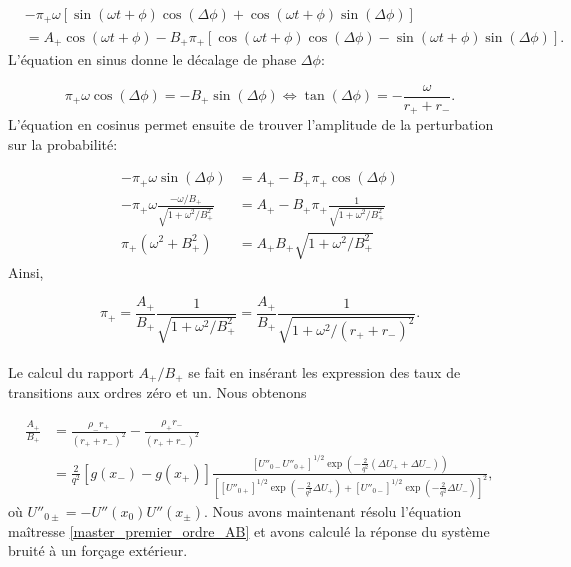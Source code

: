 \begin{equation}
\begin{split}
	&-\pi_+ \omega [\sin(\omega t+\phi)\cos(\Delta\phi) + \cos(\omega t+\phi)\sin(\Delta\phi)] \\
	&= A_+ \cos(\omega t+\phi) - B_+ \pi_+ [\cos(\omega t+\phi)\cos(\Delta\phi) - \sin(\omega t+\phi)\sin(\Delta\phi)].
\end{split}
\end{equation}
L'équation en sinus donne le décalage de phase $\Delta\phi$:

\begin{equation}\label{eq_sinus}
	\pi_+ \omega \cos(\Delta\phi) = -B_+ \sin(\Delta\phi) \iff \tan(\Delta\phi) = -\frac{\omega}{r_+ + r_-}.
\end{equation}
L'équation en cosinus permet ensuite de trouver l'amplitude de la perturbation sur la probabilité:

\begin{equation}\label{eq_cosinus}
\begin{split}
	-\pi_+\omega \sin(\Delta\phi) &= A_+ - B_+ \pi_+ \cos(\Delta\phi) \\
	-\pi_+ \omega \frac{-\omega/B_+}{\sqrt{1+\omega^2/B_+^2}} &= A_+ - B_+ \pi_+ \frac{1}{\sqrt{1+\omega^2/B_+^2}} \\
	\pi_+ (\omega^2 + B_+^2) &= A_+B_+ \sqrt{1+\omega^2/B_+^2}
\end{split}
\end{equation}
Ainsi,

\begin{equation}\label{expr_pi_AB}
	\pi_+ = \frac{A_+}{B_+}  \frac{1}{\sqrt{1+\omega^2/B_+^2}} = \frac{A_+}{B_+} \frac{1}{\sqrt{1+\omega^2/(r_+ + r_-)^2}}
	.
\end{equation}

\paragraph{} Le calcul du rapport $A_+/B_+$ se fait en insérant les expression des taux de transitions aux ordres zéro et un. Nous obtenons

\begin{equation}\label{rapport_AB}
\begin{split}
	\frac{A_+}{B_+} &= \frac{\rho_- r_+}{(r_+ + r_-)^2} - \frac{\rho_+ r_-}{(r_+ + r_-)^2} \\
	&= \frac{2}{q^2} [g(x_-)-g(x_+)] 
	\frac{
		[U''_{0-}U''_{0+}]^{1/2} \exp(-\frac{2}{q^2} (\Delta U_+ + \Delta U_-))
	}
	{
		\left[
			[U''_{0+}]^{1/2} \exp(-\frac{2}{q^2} \Delta U_+) + [U''_{0-}]^{1/2} \exp(-\frac{2}{q^2} \Delta U_-)
		\right]^2
	} ,
\end{split}
\end{equation}
où $U''_{0\pm} = -U''(x_0)U''(x_\pm)$. Nous avons maintenant résolu l'équation maîtresse \ref{master_premier_ordre_AB} et avons calculé la réponse du système bruité à un forçage extérieur.

